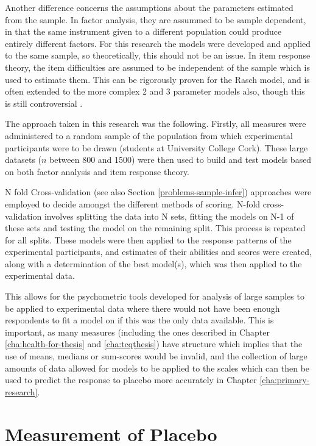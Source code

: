 Another difference concerns the assumptions about the parameters estimated from the sample. In factor analysis, they are assummed to be sample dependent, in that the same instrument given to a different population could produce entirely different factors.  For this research the models were developed and applied to the same sample, so theoretically, this should not be an issue.  In item response theory, the item difficulties are assumed to be independent of the sample which is used to estimate them. This can be rigorously proven for the Rasch model, and is often extended to the more complex 2 and 3 parameter models also, though this is still controversial \cite{van1997handbook}.

The approach taken in this research  was the following. Firstly, all measures were administered to a random sample of the population from which experimental participants were to be drawn (students at University College Cork). These large datasets ($n$ between 800 and 1500) were then used to build and test models based on both factor analysis and item response theory.

N fold Cross-validation \cite{friedman2009elements} (see also Section \ref{problems-sample-infer}) approaches were employed to decide amongst the different methods of scoring. N-fold cross-validation involves splitting the data into N sets, fitting the models on N-1 of these sets and testing the model on the remaining split. This process is repeated for all splits. These models were then  applied to the response patterns of the experimental participants, and estimates of their abilities and scores were created, along with a determination of the best model(s), which was then applied to the experimental data. 

 This allows for the psychometric tools developed for analysis of large samples to be applied to experimental data where there would not have been enough respondents to fit a model on if this was the only data available. This is important, as many measures (including the ones described in Chapter \ref{cha:health-for-thesis} and \ref{cha:tcqthesis}) have structure which implies that the use of means, medians or sum-scores would be invalid, and the collection of large amounts of data allowed for models to be applied to the scales which can then be used to predict the response to placebo more accurately in Chapter \ref{cha:primary-research}. 

\section{Measurement of Placebo}
\label{sec:measurement-placebo}

